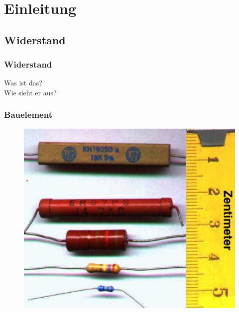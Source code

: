 

\subtitle{Technik Klasse E 04: \\
  Der Widerstand und seine Schaltungsarten \\[2em]}
\date{Stand 18.09.2017}


\section*{Einleitung}
\subsection*{Widerstand}

\begin{frame}
  \frametitle{Widerstand}
  \begin{center}
    \Large{Was ist das?} \\
    \Large{Wie sieht er aus?}
  \end{center}
\end{frame}


\begin{frame}
  \frametitle{Bauelement}

  \begin{center}
    \begin{figure}
      \includegraphics[width=1\textwidth,height=.75\textheight,keepaspectratio]{e04/Widerstaende.jpg}
    \end{figure}
  \end{center}


\end{frame}

